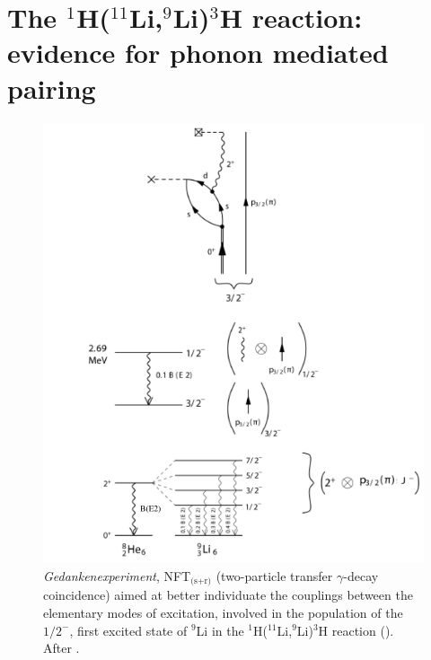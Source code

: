  \section[Evidence for phonon mediated pairing]{The $^1$H($^{11}$Li,$^9$Li)$^3$H reaction: evidence for phonon mediated pairing}\label{C8S1}
    \begin{figure}
    \centerline{\includegraphics*[width=12cm,angle=0]{C8/figsC8/fig8_1_3x}}
    	\caption{\emph{Gedankenexperiment}, NFT$_{\text{(s+r)}}$ (two-particle transfer $\gamma$-decay coincidence) aimed at better individuate the couplings between the elementary modes of excitation,  involved in the population of the $1/2^-$, first excited state of $^9$Li  in the  $^1$H($^{11}$Li,$^9$Li)$^3$H  reaction (\cite{Tanihata:08,Barranco:01,Potel:10}). After \cite{Potel:14}. }\label{fig8_1_3}
    \end{figure}
